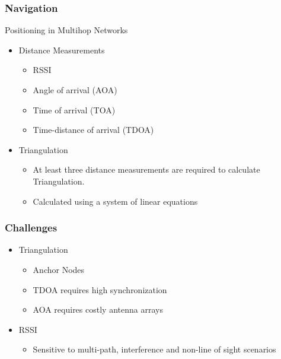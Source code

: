     

\begin{frame}[t]
  \frametitle{Navigation}
  
  Positioning in Multihop Networks
  \begin{itemize}
  \item Distance Measurements
    \begin{itemize}
    \item RSSI
    \item Angle of arrival (AOA)
    \item Time of arrival (TOA)
    \item Time-distance of arrival (TDOA)
    \end{itemize}
  \item Triangulation
    \begin{itemize}
      \item At least three distance measurements are required to calculate
        Triangulation.
      \item Calculated using a system of linear equations
    \end{itemize}
  \end{itemize}

  \vfill

\end{frame}

\begin{frame}[t]
  \frametitle{Challenges}

  \begin{itemize}
  \item Triangulation
    \begin{itemize}
    \item Anchor Nodes
    \item TDOA requires high synchronization
    \item AOA requires costly antenna arrays
    \end{itemize}
  \item RSSI
    \begin{itemize}
      \item Sensitive to multi-path, interference and non-line of sight
        scenarios
    \end{itemize}
  \end{itemize}

  \vfill
    \begin{flushleft}
    \begin{tiny}
      \begin{minipage}{1.0\linewidth}
      \end{minipage}
    \end{tiny}
  \end{flushleft}


\end{frame}

